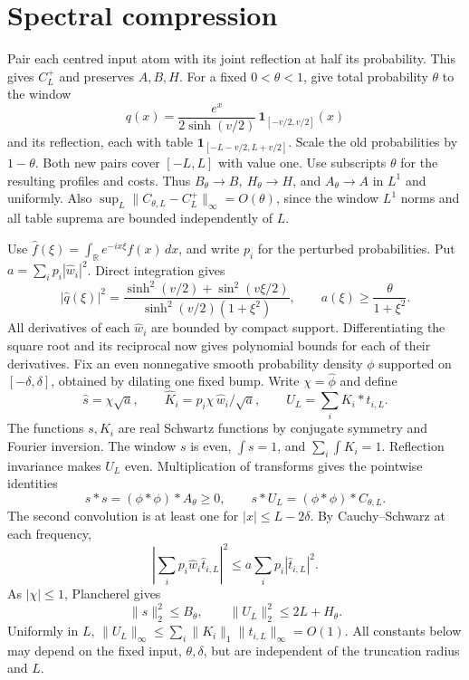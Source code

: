 \documentclass[11pt]{article}
\newcommand{\R}{\mathbb R}
\newcommand{\ind}{\mathbf1}
\newcommand{\norm}[1]{\lVert #1\rVert}
\begin{document}
\section{Spectral compression}
Pair each centred input atom with its joint reflection at half its probability. This gives \(C_L^+\) and preserves \(A,B,H\). For a fixed \(0<\theta<1\), give total probability \(\theta\) to the window
\[
 q(x)=\frac{e^x}{2\sinh(v/2)}\,\ind_{[-v/2,v/2]}(x)
\]
and its reflection, each with table \(\ind_{[-L-v/2,L+v/2]}\). Scale the old probabilities by \(1-\theta\). Both new pairs cover \([-L,L]\) with value one. Use subscripts \(\theta\) for the resulting profiles and costs. Thus \(B_\theta\to B,\ H_\theta\to H\), and \(A_\theta\to A\) in \(L^1\) and uniformly. Also \(\sup_L\norm{C_{\theta,L}-C_L^+}_\infty=O(\theta)\), since the window \(L^1\) norms and all table suprema are bounded independently of \(L\).

Use \(\widehat f(\xi)=\int_{\R} e^{-ix\xi}f(x)\,dx\), and write \(p_i\) for the perturbed probabilities. Put \(a=\sum_i p_i|\widehat w_i|^2\). Direct integration gives
\[
 |\widehat q(\xi)|^2=
 \frac{\sinh^2(v/2)+\sin^2(v\xi/2)}{\sinh^2(v/2)(1+\xi^2)},
 \qquad a(\xi)\ge\frac{\theta}{1+\xi^2}.
\]
All derivatives of each \(\widehat w_i\) are bounded by compact support. Differentiating the square root and its reciprocal now gives polynomial bounds for each of their derivatives. Fix an even nonnegative smooth probability density \(\phi\) supported on \([-\delta,\delta]\), obtained by dilating one fixed bump. Write \(\chi=\widehat\phi\) and define
\[
 \widehat s=\chi\sqrt a,\qquad
 \widehat K_i=p_i\chi\,\widehat w_i/\sqrt a,\qquad
 U_L=\sum_i K_i*t_{i,L}.
\]
The functions \(s,K_i\) are real Schwartz functions by conjugate symmetry and Fourier inversion. The window \(s\) is even, \(\int s=1\), and \(\sum_i\int K_i=1\). Reflection invariance makes \(U_L\) even. Multiplication of transforms gives the pointwise identities
\begin{equation}
 s*s=(\phi*\phi)*A_\theta\ge0,\qquad
 s*U_L=(\phi*\phi)*C_{\theta,L}.
 \label{eq:exact}
\end{equation}
The second convolution is at least one for \(|x|\le L-2\delta\). By Cauchy--Schwarz at each frequency,
\[
 \left|\sum_i p_i\widehat w_i\widehat t_{i,L}\right|^2
 \le a\sum_i p_i|\widehat t_{i,L}|^2 .
\]
As \(|\chi|\le1\), Plancherel gives
\begin{equation}
 \norm{s}_2^2\le B_\theta,\qquad
 \norm{U_L}_2^2\le 2L+H_\theta .
 \label{eq:projection}
\end{equation}
Uniformly in \(L\), \(\norm{U_L}_\infty\le\sum_i\norm{K_i}_1\norm{t_{i,L}}_\infty=O(1)\). All constants below may depend on the fixed input, \(\theta,\delta\), but are independent of the truncation radius and \(L\).
\end{document}
